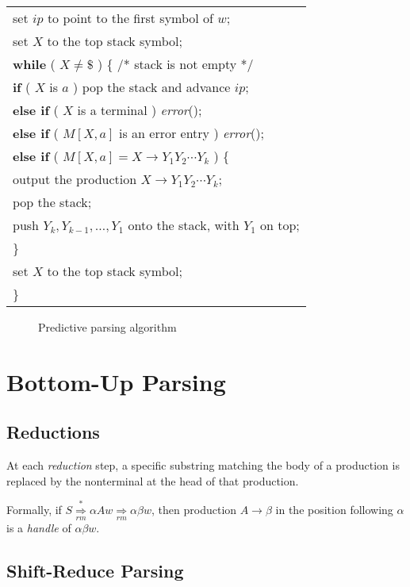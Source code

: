 \documentclass[12pt,a4paper,twoside,openany]{book}
\begin{document}
\begin{center}
    \begin{tabular}{l}
        set $ip$ to point to the first symbol of $w$;\\
        set $X$ to the top stack symbol;\\
        \textbf{while} ( $X\ne\mathdollar$ ) \{ /* stack is not empty */\\
        \qquad\textbf{if} ( $X$ is $a$ ) pop the stack and advance $ip$;\\
        \qquad\textbf{else if} ( $X$ is a terminal ) \textit{error}();\\
        \qquad\textbf{else if} ( $M[X,a]$ is an error entry ) \textit{error}();\\
        \qquad\textbf{else if} ( $M[X,a]=X\rightarrow Y_1Y_2\cdots Y_k$ ) \{\\
        \qquad\qquad output the production $X\rightarrow Y_1Y_2\cdots Y_k$;\\
        \qquad\qquad pop the stack;\\
        \qquad\qquad push $Y_k,Y_{k-1},\ldots,Y_1$ onto the stack, with $Y_1$ on top;\\
        \qquad \}\\
        \qquad set $X$ to the top stack symbol;\\
        \}
    \end{tabular}
\end{center}
\begin{figure}[htbp]
    \caption{Predictive parsing algorithm}
    \label{Figure:4.20}
\end{figure}

\section{Bottom-Up Parsing}
\subsection{Reductions}

At each \textit{reduction} step, a specific substring matching the body of a production is replaced by the nonterminal at the head of that production.

Formally, if $S\underset{rm}{\overset{*}{\Rightarrow}}\alpha Aw\underset{rm}{\Rightarrow}\alpha\beta w$, then production $A\rightarrow\beta$ in the position following $\alpha$ is a \textit{handle} of $\alpha\beta w$.

\subsection{Shift-Reduce Parsing}
\end{document}
